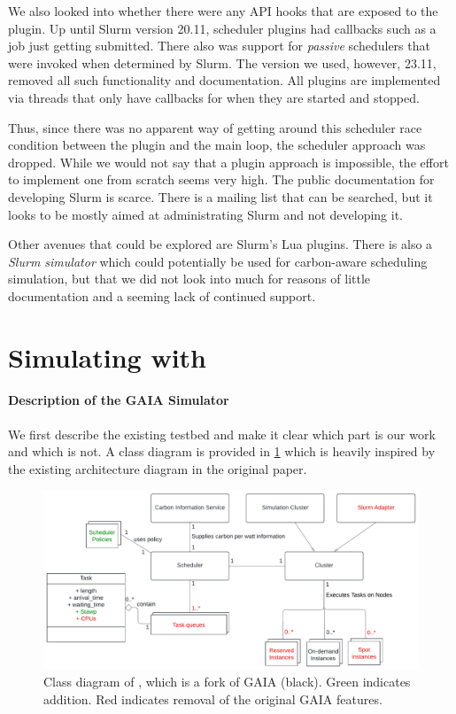 We also looked into whether there were any API hooks that are exposed to the plugin. 
Up until Slurm version 20.11, scheduler plugins had callbacks such as a job just getting submitted. There also was support for \emph{passive} schedulers that were invoked when determined by Slurm.
The version we used, however,  23.11, removed all such functionality and documentation. All plugins are implemented via threads that only have callbacks for when they are started and stopped.

Thus, since there was no apparent way of getting around this scheduler race condition between the plugin and the main loop, the scheduler approach was dropped. 
While we would not say that a plugin approach is impossible, the effort to implement one from scratch seems very high. 
The public documentation for developing Slurm is scarce. 
There is a mailing list that can be searched, but it looks to be mostly aimed at administrating Slurm and not developing it.

Other avenues that could be explored are Slurm's Lua plugins. 
There is also a \emph{Slurm simulator} which could potentially be used for carbon-aware scheduling simulation, but that we did not look into much for reasons of little documentation and a seeming lack of continued support.

\section{Simulating with \programname{}}

\paragraph{Description of the GAIA Simulator}

We first describe the existing testbed and make it clear which part is our work and which is not. A class diagram is provided in \ref{fig:class_diagram} which is heavily inspired by the existing architecture diagram in the original paper. 

\begin{figure}
    \includegraphics[width=\linewidth]{images/MA Thesis Diagram.pdf}
    \caption{Class diagram of \programname{}, which is a fork of GAIA (black). Green indicates addition. Red indicates removal of the original GAIA features.}
    \label{fig:class_diagram}
\end{figure}

